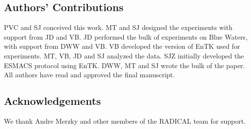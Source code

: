 \documentclass{bmcart}
\begin{document}
\subsection{Authors' Contributions}
PVC and SJ conceived this work. MT and SJ
designed the experiments with support from JD and VB. JD performed the bulk of
experiments on Blue Waters, with support from DWW and VB. VB developed the
version of EnTK used for experiments. MT, VB, JD and SJ analyzed the data. SJZ
initially developed the ESMACS protocol using EnTK. DWW, MT and SJ wrote the
bulk of the paper. All authors have read and approved the final manuscript. 

\subsection{Acknowledgements}
We thank Andre Merzky and other members of the RADICAL team for support.







\end{document}
